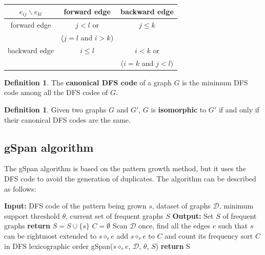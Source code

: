 \documentclass[12pt, openany]{report}
\theoremstyle{definition}
\newtheorem{definition}[thm]{Definition}
\begin{document}
\begin{center}
    \begin{tabular}{|c|c|c|}
        \hline
        $e_{ij} \backslash e_{kl}$ & forward edge & backward edge \\
        \hline
        forward edge & $j < l$ or  & $j \leq k$ \\
        & ($j = l$ and $i > k$) & \\
        \hline
        backward edge & $i \leq l$ & $i < k$ or  \\
        & & ($i = k$ and $j < l$)\\
        \hline
    \end{tabular}
\end{center}
\begin{definition}
    The \textbf{canonical DFS code} of a graph $G$ is the minimum DFS code among all the DFS codes of $G$.
\end{definition}
\begin{definition}
    Given two graphs $G$ and $G'$, $G$ is \textbf{isomorphic} to $G'$ if and only if their canonical DFS codes are the same.
\end{definition}
\subsection{gSpan algorithm}
The gSpan algorithm is based on the pattern growth method, but it uses the DFS code to avoid the generation of duplicates. The algorithm can be described as follows:
\begin{algorithm}[H]
    \caption{gSpan algorithm}
    \begin{algorithmic}[1]
        \State \textbf{Input:} DFS code of the pattern being grown $s$, dataset of graphs $\mathcal{D}$, minimum support threshold $\theta$, current set of frequent graphs $S$
        \State \textbf{Output:} Set $S$ of frequent graphs
            \State \textbf{return}
        \EndIf
        \State $S = S \cup \{s\}$
        \State $C = \emptyset$
        \State Scan $\mathcal{D}$ once, find all the edges $e$ such that $s$ can be rightmost extended to $s \diamond_r e$
        \State add $s \diamond_r e$ to $C$ and count its frequency
        \State sort $C$ in DFS lexicographic order
            \State gSpan($s \diamond_r e$, $\mathcal{D}$, $\theta$, $S$)
        \EndFor
        \State \textbf{return} S
    \end{algorithmic}
\end{algorithm}
\end{document}
